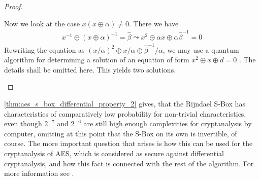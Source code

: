 \documentclass[10pt]{amsart}
\theoremstyle{definition}
\theoremstyle{remark}
\begin{document}
\begin{proof}
\begin{enumerate}[wide]
            Now we look at the case \(x(x \oplus \alpha) \neq 0\). There we have
            \begin{align}
                x^{-1} \oplus (x \oplus \alpha)^{-1} = \hat{\beta} \leadsto x^2 \oplus \alpha x \oplus \alpha \hat{\beta}^{-1} = 0
            \end{align}
            Rewriting the equation as \((x/\alpha)^2 \oplus x/\alpha \oplus \hat{\beta}^{-1}/\alpha\), we may use a quantum algorithm for determining a solution of an equation of form \(x^2 \oplus x \oplus d = 0\) \cite[pp. 64-65]{Bonnetain_2019}. The details shall be omitted here. This yields two solutions.
        \end{enumerate}
    \end{proof}

     \ref{thm:aes_s_box_differential_property_2} gives, that the Rijndael S-Box has characteristics of comparatively low probability for non-trivial characteristics, even though \(2^{-7}\) and \(2^{-6}\) are still high enough complexities for cryptanalysis by computer, omitting at this point that the S-Box on its own is invertible, of course. The more important question that arises is how this can be used for the cryptanalysis of AES, which is considered as secure against differential cryptanalysis, and how this fact is connected with the rest of the algorithm. For more information see \cite{Bonnetain_2019}.

    \printbibliography{}
\end{document}
